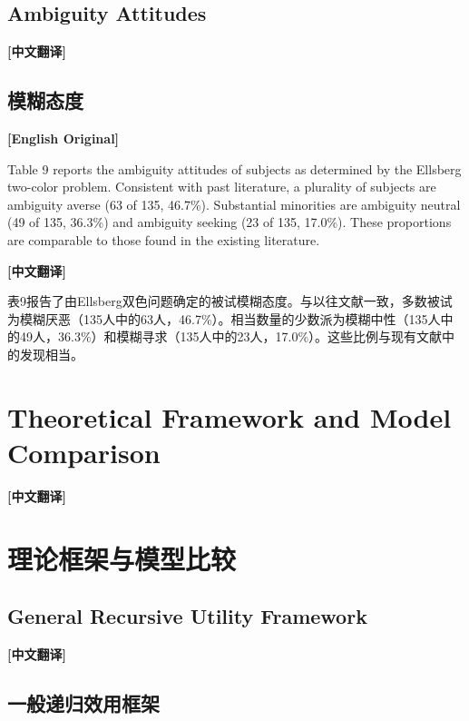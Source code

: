 \documentclass[12pt,a4paper]{ctexart}
\newenvironment{original}{%
  \par\medskip\noindent\textbf{[English Original]}\par\smallskip
  \color{black}\small
}{%
  \par\medskip
}
\newenvironment{translation}{%
  \par\noindent\textbf{[中文翻译]}\par\smallskip
  \color{blue}\small
}{%
  \par\bigskip
}
\theoremstyle{definition}
\theoremstyle{remark}
\begin{document}
\subsection{Ambiguity Attitudes}
\begin{translation}
\subsection*{模糊态度}
\end{translation}

\begin{original}
Table 9 reports the ambiguity attitudes of subjects as determined by the Ellsberg two-color problem. Consistent with past literature, a plurality of subjects are ambiguity averse (63 of 135, 46.7\%). Substantial minorities are ambiguity neutral (49 of 135, 36.3\%) and ambiguity seeking (23 of 135, 17.0\%). These proportions are comparable to those found in the existing literature.
\end{original}
\begin{translation}
表9报告了由Ellsberg双色问题确定的被试模糊态度。与以往文献一致，多数被试为模糊厌恶（135人中的63人，46.7\%）。相当数量的少数派为模糊中性（135人中的49人，36.3\%）和模糊寻求（135人中的23人，17.0\%）。这些比例与现有文献中的发现相当。
\end{translation}

\newpage

\section{Theoretical Framework and Model Comparison}
\begin{translation}
\section*{理论框架与模型比较}
\end{translation}

\subsection{General Recursive Utility Framework}
\begin{translation}
\subsection*{一般递归效用框架}
\end{translation}
\end{document}
